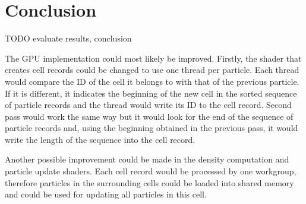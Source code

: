 \documentclass[a4paper,report]{IEEEtran}
\begin{document}
\section{Conclusion}
\label{sec:improvements}
TODO evaluate results, conclusion

The GPU implementation could most likely be improved. Firstly, the shader that creates cell records could be changed to use one thread per particle. Each thread would compare the ID of the cell it belongs to with that of the previous particle. If it is different, it indicates the beginning of the new cell in the sorted sequence of particle records and the thread would write its ID to the cell record. Second pass would work the same way but it would look for the end of the sequence of particle records and, using the beginning obtained in the previous pass, it would write the length of the sequence into the cell record.

Another possible improvement could be made in the density computation and particle update shaders. Each cell record would be processed by one workgroup, therefore particles in the surrounding cells could be loaded into shared memory and could be used for updating all particles in this cell.


%
%

\end{document}
